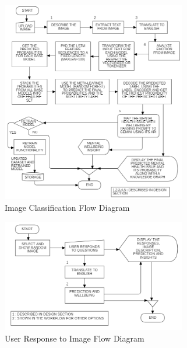 \pagebreak

\begin{figure}[h!]  
    \centering
    \includegraphics[width=0.72\textwidth]{Images/APP IMAGE OPTION.png}  
    \caption{Image Classification Flow Diagram}
    \label{011232i}  %
\end{figure}

\begin{figure}[h!]  
    \centering
    \includegraphics[width=0.72\textwidth]{Images/APP RESPOND.png}  
    \caption{User Response to Image Flow Diagram}
    \label{01234i}  %
\end{figure}

\pagebreak

